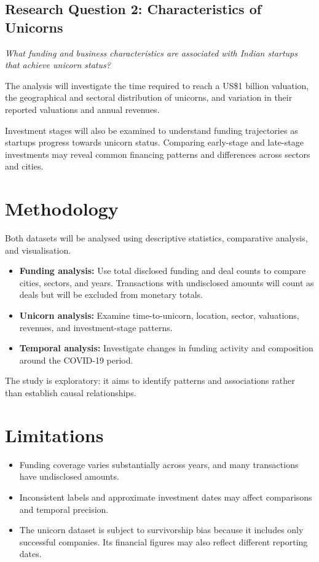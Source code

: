 \documentclass[10pt,a4paper]{article}
\begin{document}
\subsection{Research Question 2: Characteristics of Unicorns}

\textit{What funding and business characteristics are associated
with Indian startups that achieve unicorn status?}

The analysis will investigate the time required to reach a
US\$1 billion valuation, the geographical and sectoral distribution
of unicorns, and variation in their reported valuations and
annual revenues.

Investment stages will also be examined to understand funding
trajectories as startups progress towards unicorn status. Comparing
early-stage and late-stage investments may reveal common financing
patterns and differences across sectors and cities.

\section{Methodology}

Both datasets will be analysed using descriptive statistics,
comparative analysis, and visualisation.

\begin{itemize}
    \item \textbf{Funding analysis:} Use total disclosed funding
    and deal counts to compare cities, sectors, and years.
    Transactions with undisclosed amounts will count as deals
    but will be excluded from monetary totals.

    \item \textbf{Unicorn analysis:} Examine time-to-unicorn,
    location, sector, valuations, revenues, and investment-stage
    patterns.

    \item \textbf{Temporal analysis:} Investigate changes in
    funding activity and composition around the COVID-19 period.
\end{itemize}

The study is exploratory: it aims to identify patterns and
associations rather than establish causal relationships.

\section{Limitations}

\begin{itemize}
    \item Funding coverage varies substantially across years,
    and many transactions have undisclosed amounts.

    \item Inconsistent labels and approximate investment dates
    may affect comparisons and temporal precision.

    \item The unicorn dataset is subject to survivorship bias
    because it includes only successful companies. Its financial
    figures may also reflect different reporting dates.
\end{itemize}
\end{document}
